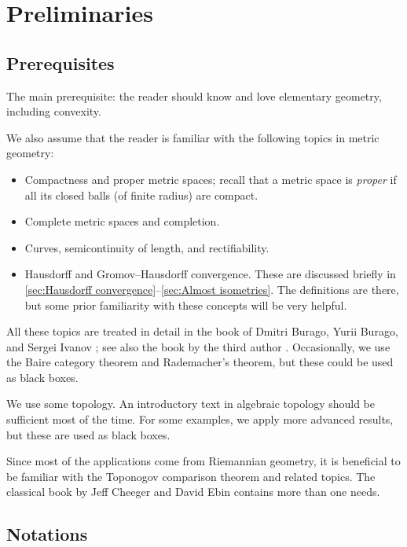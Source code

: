 \chapter*{Preliminaries}
{}
%

\section{Prerequisites}

The main prerequisite: the reader should know and love elementary geometry, including convexity.

We also assume that the reader is familiar with the following topics in metric geometry:
\begin{itemize}
\item Compactness and proper metric spaces;
recall that a metric space is \emph{proper} if all its closed balls (of finite radius) are compact.
\item Complete metric spaces and completion.
\item Curves, semicontinuity of length, and rectifiability.
\item Hausdorff and Gromov--Hausdorff convergence.
These are discussed briefly in \ref{sec:Hausdorff convergence}--\ref{sec:Almost isometries}.
The definitions are there, but some prior familiarity with these concepts will be very helpful.
\end{itemize}
All these topics are treated in detail in the book of Dmitri Burago, Yurii Burago, and Sergei Ivanov \cite{burago-burago-ivanov}; see also the book by the third author \cite{petrunin2023pure}.
Occasionally, we use the Baire category theorem and Rademacher's theorem, but these could be used as black boxes.

We use some topology. 
An introductory text in algebraic topology should be sufficient most of the time.
For some examples, we apply more advanced results, but these are used as black boxes.

Since most of the applications come from Riemannian geometry, it is beneficial to be familiar with the Toponogov comparison theorem and related topics.
The classical book by Jeff Cheeger and David Ebin \cite{cheeger-ebin} contains more than one needs.

\section{Notations}

